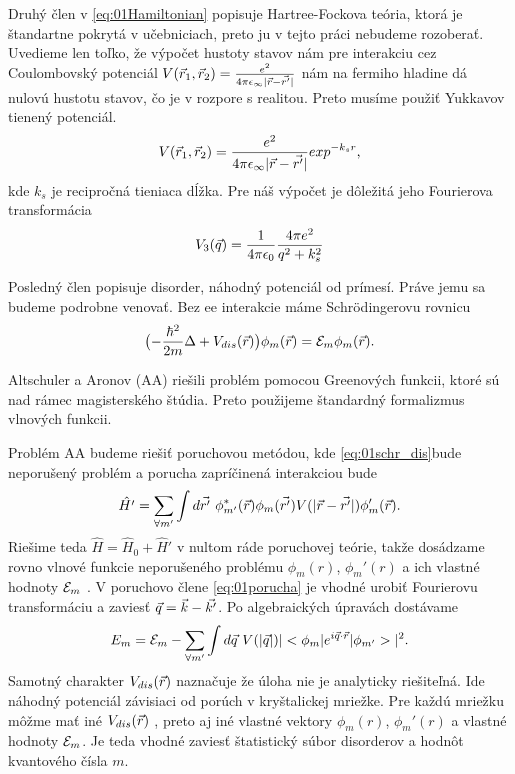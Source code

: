 Druhý člen v \eqref{eq:01Hamiltonian}  popisuje Hartree-Fockova teória, ktorá je štandartne pokrytá v učebniciach, preto ju v tejto práci nebudeme rozoberať.
Uvedieme len toľko, že výpočet hustoty stavov nám pre interakciu cez Coulombovský potenciál $V(\vec{r}_1, \vec{r}_2)=\frac{e^2}{4\pi \epsilon_{\infty}|\vec{r}-\vec{r'}|}$ nám na fermiho hladine dá nulovú hustotu stavov, čo je v rozpore s realitou. Preto musíme použiť Yukkavov tienený potenciál.  
\begin{equation}
\label{eq:01yukk_pot}
V(\vec{r}_1, \vec{r}_2)=\frac{e^2}{4\pi \epsilon_{\infty}|\vec{r}-\vec{r'}|}exp^{-k_sr}\text{,}
\end{equation}
kde $k_s$ je recipročná tieniaca dĺžka. Pre náš výpočet je dôležitá jeho Fourierova transformácia
\begin{equation}
\label{eq:01pot3D}
V_3(\vec{q})=\frac{1}{4\pi\epsilon_0}\frac{4\pi e^2}{q^2+k_{s}^{2} }
\end{equation}

Posledný člen popisuje disorder, náhodný potenciál od prímesí. Práve jemu sa 
budeme podrobne venovať.  Bez ee interakcie máme Schr\"odingerovu rovnicu 
\begin{equation}
\label{eq:01schr_dis}
\bigl(-\frac{\hbar^2}{2m}\Delta + V_{dis}(\vec{r})\bigr)\phi_m(\vec{r})=\mathcal{E}_m\phi_m(\vec{r}) \text{.}
\end{equation} 

Altschuler a Aronov (AA) riešili problém pomocou Greenových funkcii, ktoré sú nad rámec 
magisterského štúdia. Preto použijeme štandardný formalizmus vlnových funkcii.

Problém AA budeme riešiť poruchovou metódou, kde \eqref{eq:01schr_dis}bude 
neporušený problém a porucha zapríčinená interakciou bude 
\begin{equation}
 \label{eq:01porucha}
 \hat{H'}=\sum_{\forall m'} \int d\vrp \ \phi^*_{m'}(\vr)\phi_{m}(\vrp)V(|\vr-\vrp|)
 \phi_m'(\vr) \text{.}
\end{equation} 
Riešime teda $\hat H=\hat H_0+\hat H'$ v nultom ráde poruchovej teórie, takže dosádzame rovno vlnové funkcie neporušeného problému $\phi_m(r)$, $\phi_m'(r)$ a ich vlastné hodnoty $\mathcal{E}_m$ .  V poruchovo člene \eqref{eq:01porucha} je vhodné urobiť Fourierovu transformáciu a zaviesť $\vec{q}=\vec{k}-\vec{k'}$. Po algebraických úpravách dostávame
\begin{equation}
\label{eq:01erg_V_ft} 
 E_m=\mathcal{E}_m-\sum_{\forall m'} \int d\vec{q}\ V(|\vec{q}|) |<\phi_m|e^{i\vec{q}\cdot\vec{r}}|\phi_{m'}>|^2 \text{.}
\end{equation} 
Samotný charakter $V_{dis}(\vec{r})$ naznačuje že úloha nie je analyticky riešiteľná. Ide
náhodný potenciál závisiaci od porúch v kryštalickej mriežke. Pre každú mriežku môžme 
mať  iné $V_{dis}(\vec{r})$ 
, preto aj iné vlastné vektory $\phi_m(r)$, $\phi_m'(r)$ a vlastné hodnoty $\mathcal{E}_m$. Je teda 
vhodné zaviesť 
štatistický súbor disorderov a hodnôt kvantového čísla $m$.

